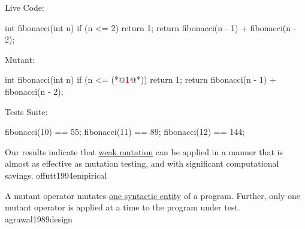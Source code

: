 \documentclass{article}
\begin{document}
\begin{pptWide}{3}
Live Code:\par
{\small\begin{ffcode}
int fibonacci(int n) {
  if (n <= 2) {
    return 1;
  }
  return fibonacci(n - 1)
    + fibonacci(n - 2);
}
\end{ffcode}
}
\par\columnbreak\par
Mutant:\par
{\small\begin{ffcode}
int fibonacci(int n) {
  if (n <= (*@\textcolor{red}{\textbf{1}}@*)) {
    return 1;
  }
  return fibonacci(n - 1)
    + fibonacci(n - 2);
}
\end{ffcode}
}
\par\columnbreak\par
Tests Suite:\par
{\small\begin{ffcode}
fibonacci(10) == 55;
fibonacci(11) == 89;
fibonacci(12) == 144;
\end{ffcode}
}
\end{pptWide}
\plush{}

  {Our results indicate that \ul{weak mutation} can be applied in a manner that is almost as effective as mutation testing, and with significant computational savings.}
  {offutt1994empirical}

  {A mutant operator mutates \ul{one syntactic entity} of a program. Further, only one mutant operator
is applied at a time to the program under test.}
  {agrawal1989design}
\end{document}
